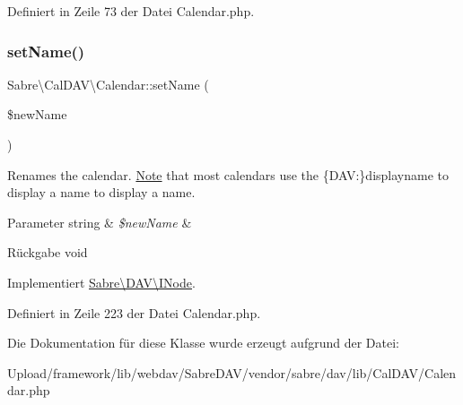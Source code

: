 Definiert in Zeile 73 der Datei Calendar.\+php.

\mbox{\label{class_sabre_1_1_cal_d_a_v_1_1_calendar_a4ed32462bdf6e4bfcefeff3349db7ba0}} 
\subsubsection{\texorpdfstring{set\+Name()}{setName()}}
{\footnotesize\ttfamily Sabre\textbackslash{}\+Cal\+D\+A\+V\textbackslash{}\+Calendar\+::set\+Name (\begin{DoxyParamCaption}\item[{}]{\$new\+Name }\end{DoxyParamCaption})}

Renames the calendar. \mbox{\hyperlink{class_note}{Note}} that most calendars use the \{D\+AV\+:\}displayname to display a name to display a name.


\begin{DoxyParams}[1]{Parameter}
string & {\em \$new\+Name} & \\
\hline
\end{DoxyParams}
\begin{DoxyReturn}{Rückgabe}
void 
\end{DoxyReturn}


Implementiert \mbox{\hyperlink{interface_sabre_1_1_d_a_v_1_1_i_node_ac90fa5526e98def2e1f51bc57a772366}{Sabre\textbackslash{}\+D\+A\+V\textbackslash{}\+I\+Node}}.



Definiert in Zeile 223 der Datei Calendar.\+php.



Die Dokumentation für diese Klasse wurde erzeugt aufgrund der Datei\+:\begin{DoxyCompactItemize}
\item 
Upload/framework/lib/webdav/\+Sabre\+D\+A\+V/vendor/sabre/dav/lib/\+Cal\+D\+A\+V/Calendar.\+php\end{DoxyCompactItemize}
